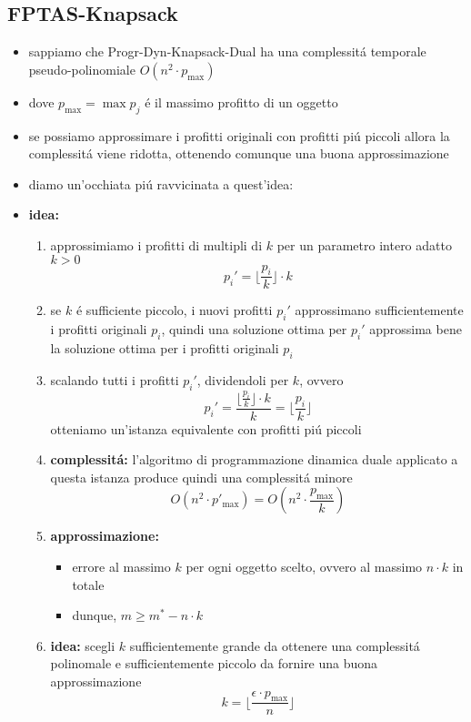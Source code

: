 \subsection*{FPTAS-Knapsack}
\begin{flushleft}
	\begin{itemize}
		\item sappiamo che Progr-Dyn-Knapsack-Dual ha una complessit\'a temporale pseudo-polinomiale $O(n^2\cdot p_{\max})$
		\item dove $p_{\max}=\max p_j$ \'e il massimo profitto di un oggetto
		\item se possiamo approssimare i profitti originali con profitti pi\'u piccoli allora la complessit\'a viene ridotta, ottenendo comunque una buona approssimazione
		\item diamo un'occhiata pi\'u ravvicinata a quest'idea:
		\item \textbf{idea:}
		\begin{enumerate}
			\item approssimiamo i profitti di multipli di $k$ per un parametro intero adatto $k>0$
				$$p_i'=\lfloor\frac{p_i}{k}\rfloor\cdot k$$
			\item se $k$ \'e sufficiente piccolo, i nuovi profitti $p_i'$ approssimano sufficientemente i profitti originali $p_i$, quindi una soluzione ottima per $p_i'$ approssima bene la soluzione ottima per i profitti originali $p_i$
			\item scalando tutti i profitti $p_i'$, dividendoli per $k$, ovvero
				$$p_i'=\frac{\lfloor\frac{p_i}{k}\rfloor\cdot k}{k}=\lfloor\frac{p_i}{k}\rfloor$$
			otteniamo un'istanza equivalente con profitti pi\'u piccoli
			\item \textbf{complessit\'a:} l'algoritmo di programmazione dinamica duale applicato a questa istanza produce quindi una complessit\'a minore \newline \\
				$$O(n^2\cdot p'_{\max})=O(n^2\cdot\frac{p_{\max}}{k})$$
			\item \textbf{approssimazione:}
			\begin{itemize}
				\item errore al massimo $k$ per ogni oggetto scelto, ovvero al massimo $n\cdot k$ in totale
				\item dunque, $m\geq m^*-n\cdot k$
			\end{itemize}
			\item \textbf{idea:} scegli $k$ sufficientemente grande da ottenere una complessit\'a polinomale e sufficientemente piccolo da fornire una buona approssimazione
				$$k=\lfloor\frac{\epsilon\cdot p_{\max}}{n}\rfloor$$
		\end{enumerate}
	\end{itemize}
\end{flushleft}

